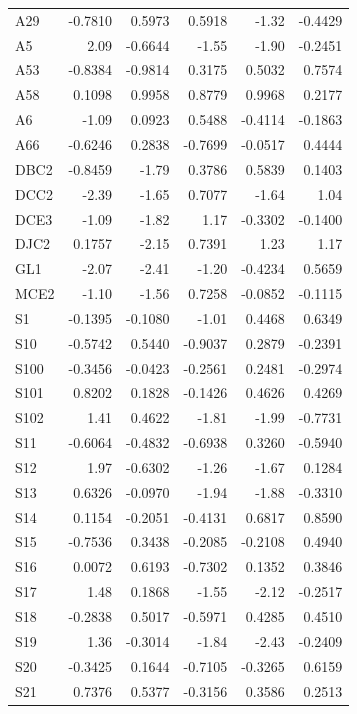 \begin{longtable}{lrrrrr}
  A29 & -0.7810 & 0.5973 & 0.5918 & -1.32 & -0.4429 \\
  A5 & 2.09 & -0.6644 & -1.55 & -1.90 & -0.2451 \\
  A53 & -0.8384 & -0.9814 & 0.3175 & 0.5032 & 0.7574 \\
  A58 & 0.1098 & 0.9958 & 0.8779 & 0.9968 & 0.2177 \\
  A6 & -1.09 & 0.0923 & 0.5488 & -0.4114 & -0.1863 \\
  A66 & -0.6246 & 0.2838 & -0.7699 & -0.0517 & 0.4444 \\
  DBC2 & -0.8459 & -1.79 & 0.3786 & 0.5839 & 0.1403 \\
  DCC2 & -2.39 & -1.65 & 0.7077 & -1.64 & 1.04 \\
  DCE3 & -1.09 & -1.82 & 1.17 & -0.3302 & -0.1400 \\
  DJC2 & 0.1757 & -2.15 & 0.7391 & 1.23 & 1.17 \\
  GL1 & -2.07 & -2.41 & -1.20 & -0.4234 & 0.5659 \\
  MCE2 & -1.10 & -1.56 & 0.7258 & -0.0852 & -0.1115 \\
  S1 & -0.1395 & -0.1080 & -1.01 & 0.4468 & 0.6349 \\
  S10 & -0.5742 & 0.5440 & -0.9037 & 0.2879 & -0.2391 \\
  S100 & -0.3456 & -0.0423 & -0.2561 & 0.2481 & -0.2974 \\
  S101 & 0.8202 & 0.1828 & -0.1426 & 0.4626 & 0.4269 \\
  S102 & 1.41 & 0.4622 & -1.81 & -1.99 & -0.7731 \\
  S11 & -0.6064 & -0.4832 & -0.6938 & 0.3260 & -0.5940 \\
  S12 & 1.97 & -0.6302 & -1.26 & -1.67 & 0.1284 \\
  S13 & 0.6326 & -0.0970 & -1.94 & -1.88 & -0.3310 \\
  S14 & 0.1154 & -0.2051 & -0.4131 & 0.6817 & 0.8590 \\
  S15 & -0.7536 & 0.3438 & -0.2085 & -0.2108 & 0.4940 \\
  S16 & 0.0072 & 0.6193 & -0.7302 & 0.1352 & 0.3846 \\
  S17 & 1.48 & 0.1868 & -1.55 & -2.12 & -0.2517 \\
  S18 & -0.2838 & 0.5017 & -0.5971 & 0.4285 & 0.4510 \\
  S19 & 1.36 & -0.3014 & -1.84 & -2.43 & -0.2409 \\
  S20 & -0.3425 & 0.1644 & -0.7105 & -0.3265 & 0.6159 \\
  S21 & 0.7376 & 0.5377 & -0.3156 & 0.3586 & 0.2513 \\

\end{longtable}
